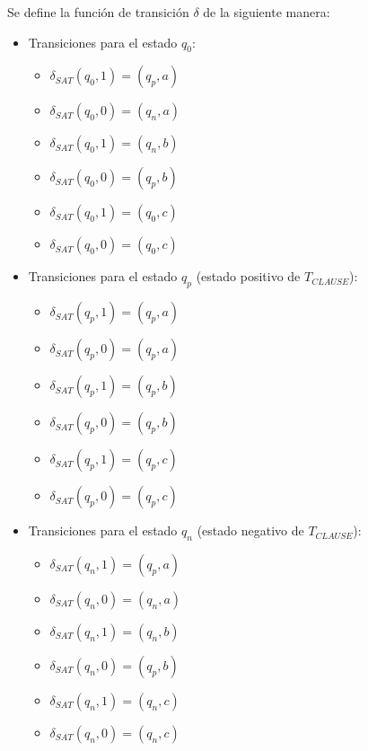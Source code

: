 Se define la función de transición $\delta$ de la siguiente manera:

\begin{itemize}
    \item Transiciones para el estado $q_0$:
          \begin{multicols}{2}
              \begin{itemize}
                  \item $\delta_{SAT}(q_0,1)=(q_p,a)$
                  \item $\delta_{SAT}(q_0,0)=(q_n,a)$
                  \item $\delta_{SAT}(q_0,1)=(q_n,b)$
                  \item $\delta_{SAT}(q_0,0)=(q_p,b)$
                  \item $\delta_{SAT}(q_0,1)=(q_0,c)$
                  \item $\delta_{SAT}(q_0,0)=(q_0,c)$
              \end{itemize}
          \end{multicols}
          
    \item Transiciones para el estado $q_p$ (estado positivo de $T_{CLAUSE}$):
          \begin{multicols}{2}
              \begin{itemize}
                  \item $\delta_{SAT}(q_{p},1)=(q_{p},a)$
                  \item $\delta_{SAT}(q_{p},0)=(q_{p},a)$
                  \item $\delta_{SAT}(q_{p},1)=(q_{p},b)$
                  \item $\delta_{SAT}(q_{p},0)=(q_{p},b)$
                  \item $\delta_{SAT}(q_{p},1)=(q_{p},c)$
                  \item $\delta_{SAT}(q_{p},0)=(q_{p},c)$
              \end{itemize}
          \end{multicols}
          
    \item Transiciones para el estado $q_n$ (estado negativo de $T_{CLAUSE}$):
          \begin{multicols}{2}
              \begin{itemize}
                  \item $\delta_{SAT}(q_{n},1)=(q_{p},a)$
                  \item $\delta_{SAT}(q_{n},0)=(q_{n},a)$
                  \item $\delta_{SAT}(q_{n},1)=(q_{n},b)$
                  \item $\delta_{SAT}(q_{n},0)=(q_{p},b)$
                  \item $\delta_{SAT}(q_{n},1)=(q_{n},c)$
                  \item $\delta_{SAT}(q_{n},0)=(q_{n},c)$
              \end{itemize}
          \end{multicols}
\end{itemize}

